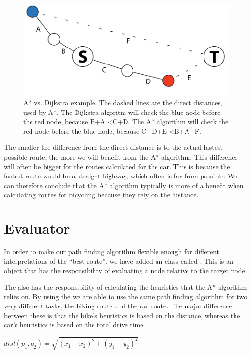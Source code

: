 \begin{figure}[!ht]
\centering
\includegraphics[width=1\linewidth]{images/AstarVSDijkstra.png}
\caption{A* vs. Dijkstra example. The dashed lines are the direct distances,
used by A*. The Dijkstra algoritm will check the blue node before the red
node, because B+A \textless C+D. The A* algorithm will check the red node
before the blue node, because C+D+E \textless B+A+F.}
\label{ad}
\end{figure}

The smaller the difference from the direct distance is to the actual fastest
possible route, the more we will benefit from the A* algorithm. This
difference will often be bigger for the routes calculated for the car. This is
because the fastest route would be a straight highway, which often is far from
possible. We can therefore conclude that the A* algorithm typically is more
of a benefit when calculating routes for bicycling because they rely on the
distance.

\section{Evaluator}
\label{IMPL-EVA}
In order to make our path finding algorithm flexible enough for different 
interpretations of the ``best route'', we have added an class called
. This is an object that has the responsibility of evaluating a node relative to 
the target node. 

The  also has the responsibility of calculating the 
heuristics that the A* algorithm relies on. By using the  we are able to 
use the same path finding algorithm for two very different tasks; the biking route and 
the car route. The major difference between these is that the bike's heuristics is based 
on the distance, whereas the car's heuristics is based on the total drive time. 

\begin{center}
$
dist(p_{1},p_{2})=\sqrt{(x_{1}-x_{2})^{2}+(y_{1}-y_{2})^{2}}
$
\end{center}

